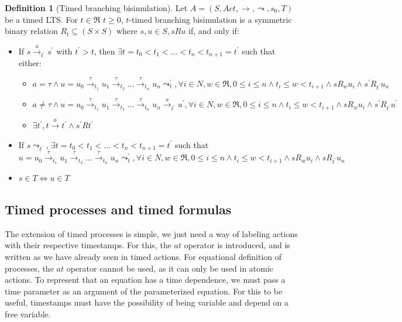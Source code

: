\documentclass[11pt]{article}
\theoremstyle{definition}
\newtheorem{definition}{Definition}
\theoremstyle{plain}
\begin{document}
\begin{definition} [Timed branching bisimulation]
	Let $ A = (S, Act, \rightarrow, \leadsto, s_0, T) $ be a timed LTS. For $ t \in \Re $ $ t \geq 0 $, $ t $-timed branching bisimulation is a symmetric binary relation $ R_t  \subseteq (S\times S) $ where $ s, u \in S, s R u $ if, and only if:
	\begin{itemize}
		\item If $ s\xrightarrow{a}_{t^\prime}s^\prime$ with $ t^\prime > t $, then $ \exists t = t_0 < t_1 < \dots < t_n < t_{n+1} = t^\prime $ such that either:
		\begin{itemize}
			\item $ a = \tau \wedge u = u_0 \xrightarrow{\tau}_{t_1} u_1 \xrightarrow{\tau}_{t_2} \dots \xrightarrow{\tau}_{t_n} u_n \leadsto_t^\prime , \forall i \in N, w \in \Re, 0 \leq i \leq n \wedge t_i \leq w < t_{i+1} \wedge s R_w u_i \wedge s^\prime R_{t^\prime} u_n $
			\item $ a \not = \tau \wedge u = u_0 \xrightarrow{\tau}_{t_1} u_1 \xrightarrow{\tau}_{t_2} \dots \xrightarrow{\tau}_{t_n} u_n \xrightarrow{a}_{t^\prime} u^\prime , \forall i \in N, w \in \Re, 0 \leq i \leq n \wedge t_i \leq w < t_{i+1} \wedge s R_w u_i \wedge s^\prime R_{t^\prime} u^\prime $
			\item $ \exists t^\prime, t\xrightarrow{a}t^\prime \wedge s^\prime R t^\prime $
		\end{itemize}
		\item If $ s\leadsto_{t^\prime}  $, $ \exists t = t_0 < t_1 < \dots < t_n < t_{n+1} = t^\prime $ such that $ u = u_0 \xrightarrow{\tau}_{t_1} u_1 \xrightarrow{\tau}_{t_2} \dots \xrightarrow{\tau}_{t_n} u_n \leadsto_t^\prime , \forall i \in N, w \in \Re, 0 \leq i \leq n \wedge t_i \leq w < t_{i+1} \wedge s R_w u_i \wedge s R_{t^\prime} u_n $
		\item $ s \in T \iff u \in T $
	\end{itemize}
\end{definition}

\subsection{Timed processes and timed formulas}

The extension of timed processes is simple, we just need a way of labeling actions with their respective timestamps. For this, the $ at $ operator is introduced, and is written as we have already seen in timed actions. For equational definition of processes, the $ at $ operator cannot be used, as it can only be used in atomic actions. To represent that an equation has a time dependence, we must pass a time parameter as an argument of the parameterized equation. For this to be useful, timestamps must have the possibility of being variable and depend on a free variable.
\end{document}
